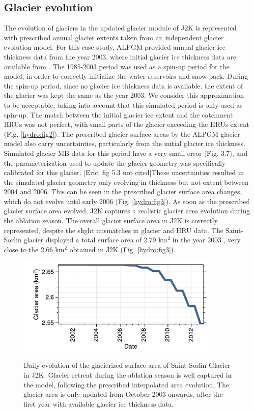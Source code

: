 \subsection{Glacier evolution}

The evolution of glaciers in the updated glacier module of J2K is represented with prescribed annual glacier extents taken from an independent glacier evolution model. For this case study, ALPGM provided annual glacier ice thickness data from the year 2003, where initial glacier ice thickness data are available from \citet{farinotti_consensus_2019}. The 1985-2003 period was used as a spin-up period for the model, in order to correctly initialize the water reservoirs and snow pack. During the spin-up period, since no glacier ice thickness data is available, the extent of the glacier was kept the same as the year 2003. We consider this approximation to be acceptable, taking into account that this simulated period is only used as spin-up. The match between the initial glacier ice extent and the catchment HRUs was not perfect, with small parts of the glacier exceeding the HRUs extent (Fig. \ref{hydro:fig2}). The prescribed glacier surface areas by the ALPGM glacier model also carry uncertainties, particularly from the initial glacier ice thickness. Simulated glacier MB data for this period have a very small error (Fig. 3.7), and the parameterization used to update the glacier geometry was specifically calibrated for this glacier. [Eric: fig 5.3 not cited]These uncertainties resulted in the simulated glacier geometry only evolving in thickness but not extent between 2004 and 2006. This can be seen in the prescribed glacier surface area changes, which do not evolve until early 2006 (Fig. \ref{hydro:fig3}). As soon as the prescribed glacier surface area evolved, J2K captures a realistic glacier area evolution during the ablation season. The overall glacier surface area in J2K is correctly represented, despite the slight mismatches in glacier and HRU data. The Saint-Sorlin glacier displayed a total surface area of 2.79 km$^{2}$ in the year 2003 \citep{gardent_multitemporal_2014}, very close to the 2.66 km$^{2}$ obtained in J2K (Fig. \ref{hydro:fig3}). 

\begin{figure}[h]
\centering
\includegraphics[width=10cm]{Figures/hydro/Figure_3.pdf}
\caption{Daily evolution of the glacierized surface area of Saint-Sorlin Glacier in J2K. Glacier retreat during the ablation season is well captured in the model, following the prescribed interpolated area evolution. The glacier area is only updated from October 2003 onwards, after the first year with available glacier ice thickness data.} 
\label{hydro:fig4}
\end{figure}

